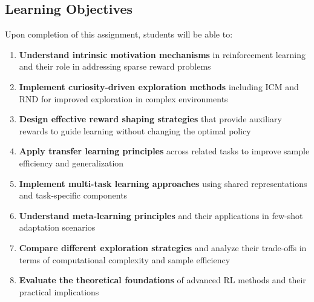 \documentclass[12pt]{article}
\begin{document}
{{\subsection*{Learning Objectives}

Upon completion of this assignment, students will be able to:

\begin{enumerate}
\item \textbf{Understand intrinsic motivation mechanisms} in reinforcement learning and their role in addressing sparse reward problems
\item \textbf{Implement curiosity-driven exploration methods} including ICM and RND for improved exploration in complex environments
\item \textbf{Design effective reward shaping strategies} that provide auxiliary rewards to guide learning without changing the optimal policy
\item \textbf{Apply transfer learning principles} across related tasks to improve sample efficiency and generalization
\item \textbf{Implement multi-task learning approaches} using shared representations and task-specific components
\item \textbf{Understand meta-learning principles} and their applications in few-shot adaptation scenarios
\item \textbf{Compare different exploration strategies} and analyze their trade-offs in terms of computational complexity and sample efficiency
\item \textbf{Evaluate the theoretical foundations} of advanced RL methods and their practical implications
\end{enumerate}

}




\newpage
{}

{}}
\end{document}
